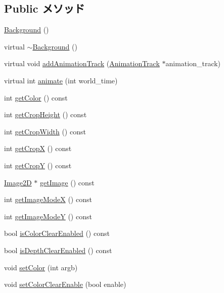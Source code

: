 \subsection*{Public メソッド}
\begin{CompactItemize}
\item 
\hyperlink{classm3g_1_1Background_2bbc220bb63956558a8603a7909c2bbd}{Background} ()
\item 
virtual \hyperlink{classm3g_1_1Background_b793cb50870532320856acdd2caf84c3}{$\sim$Background} ()
\item 
virtual void \hyperlink{classm3g_1_1Background_415c0b110f95410ded9b85e5d99a496b}{addAnimationTrack} (\hyperlink{classm3g_1_1AnimationTrack}{AnimationTrack} $\ast$animation\_\-track)
\item 
virtual int \hyperlink{classm3g_1_1Background_8aad1ceab4c2a03609c8a42324ce484d}{animate} (int world\_\-time)
\item 
int \hyperlink{classm3g_1_1Background_4cfa1931c265ec3412fe3f6408a1b4f5}{getColor} () const 
\item 
int \hyperlink{classm3g_1_1Background_d6d9d6f23b7bb004c93642bcd081f4a3}{getCropHeight} () const 
\item 
int \hyperlink{classm3g_1_1Background_5c6515f6706675ef31ca5dfa0a03b953}{getCropWidth} () const 
\item 
int \hyperlink{classm3g_1_1Background_d0ba0211183decc8f0459ca598b12912}{getCropX} () const 
\item 
int \hyperlink{classm3g_1_1Background_9ef03b219415a1f08aef6745ad5d87d0}{getCropY} () const 
\item 
\hyperlink{classm3g_1_1Image2D}{Image2D} $\ast$ \hyperlink{classm3g_1_1Background_a8c0193b0e7d47d4b5c9f60df24c44f5}{getImage} () const 
\item 
int \hyperlink{classm3g_1_1Background_0dd60d498f4d50d8808c0b3ad61bc9e8}{getImageModeX} () const 
\item 
int \hyperlink{classm3g_1_1Background_a8d38d66f133ae417956a5dc5f84551d}{getImageModeY} () const 
\item 
bool \hyperlink{classm3g_1_1Background_d6b7bfdf4225b509549e2fbb9575b509}{isColorClearEnabled} () const 
\item 
bool \hyperlink{classm3g_1_1Background_d20a03183cd1c6418dcadf94ac0ca470}{isDepthClearEnabled} () const 
\item 
void \hyperlink{classm3g_1_1Background_38439e862c59a31b90e57c18669061ae}{setColor} (int argb)
\item 
void \hyperlink{classm3g_1_1Background_68e4fe4cf32fe60f166056115081aa65}{setColorClearEnable} (bool enable)

\end{CompactItemize}
